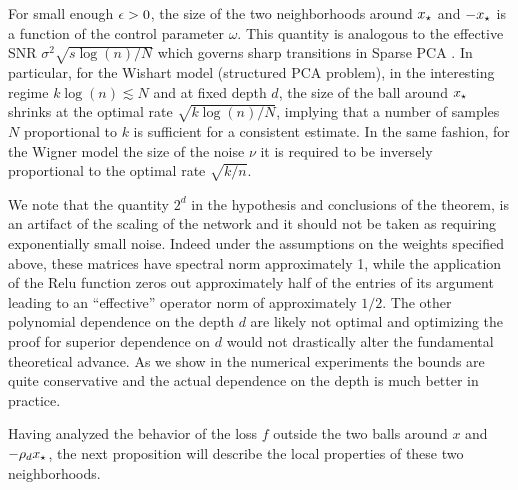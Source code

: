 For small enough $\epsilon > 0$, the size of the two neighborhoods around ${x_{\star}}$ and $-{x_{\star}}$ is a function of the control parameter $\omega$.
This quantity is analogous to the effective SNR $\sigma^2 \sqrt{s \log(n)/N}$
which governs sharp transitions in Sparse PCA \cite{amini2008high}.
In particular, for the Wishart model (structured PCA problem), in the interesting regime $k \log(n) \lesssim N$ and at fixed depth $d$, the size of the ball around ${x_{\star}}$ shrinks at the optimal rate $\sqrt{k \log(n)/N}$, implying that a number of samples $N$ proportional to $k$ is sufficient for a consistent estimate. In the same fashion, for the Wigner model the size of the noise $\nu$
it is required to be inversely proportional to the optimal rate $\sqrt{k/n}$.

We note that the quantity $2^d$ in the hypothesis and conclusions of the theorem, is an artifact of the scaling of the network and it should not be taken as requiring exponentially small noise. Indeed under the assumptions on the weights 
specified above, these matrices have spectral norm approximately 1, while the application of the Relu function zeros out approximately half of the entries of its argument leading to an ``effective'' operator norm of approximately $1/2$. The other polynomial dependence on the depth $d$ are likely not optimal and optimizing the proof for superior dependence on $d$ would not drastically alter the fundamental theoretical advance. As we show in the numerical experiments the bounds are quite conservative and the actual dependence on the depth is much better in practice.

Having analyzed the behavior of the loss $f$ outside the two balls around $x$ and $-\rho_d {x_{\star}}$, the next proposition 
will describe the local properties of these two neighborhoods.

